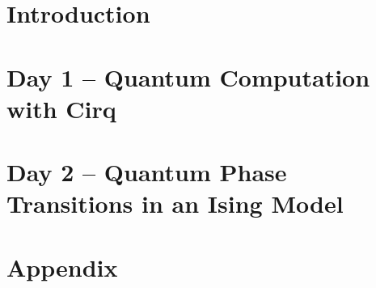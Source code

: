\documentclass[
headings=optiontohead,              %
12pt,                               %
DIV=13,                             %
open=right,                         %
toc=bibliographynumbered            %
]{scrreport}
\begin{document}
    \thispagestyle{empty}           %
    \cleardoublepage                %
    \pagestyle{scrheadings}         %
    \clearpairofpagestyles
    \ihead{\leftmark}
    \ohead{\Ifstr{\leftmark}{\rightmark}{}{\rightmark}}
    \cfoot*{\pagemark}


    \cleardoublepage
    

    \chapter{Introduction}
    

    \chapter{Day 1 -- Quantum Computation with Cirq}
    

    \chapter{Day 2 -- Quantum Phase Transitions in an Ising Model}
    
    
    \appendix
    \chapter{Appendix}
    

    
\end{document}

